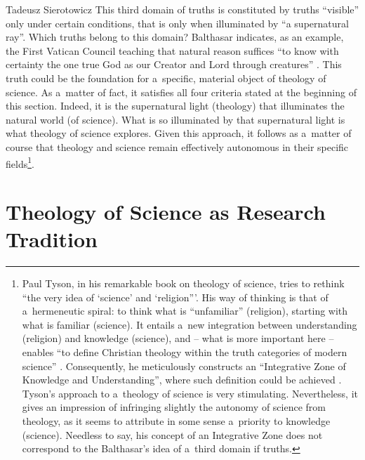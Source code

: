 \begin{artengenv}{Tadeusz Sierotowicz}
This third domain of truths is constituted by truths ``visible'' only under certain conditions, that is only when illuminated by ``a supernatural ray''. Which truths belong to this domain? Balthasar indicates, as an example, the First Vatican Council teaching that natural reason suffices ``to know with certainty the one true God as our Creator and Lord through creatures'' 
\parencite[][p.12]{balthasar_theo-logic_2000}. %
 This truth could be the foundation for a~specific, material object of theology of science. As a~matter of fact, it satisfies all four criteria stated at the beginning of this section. Indeed, it is the supernatural light (theology) that illuminates the natural world (of science). What is so illuminated by that supernatural light is what theology of science explores. Given this approach, it follows as a~matter of course that theology and science remain effectively autonomous in their specific fields\footnote{Paul Tyson, in his remarkable book on theology of science, tries to rethink ``the very idea of ‘science' and ‘religion'''. His way of thinking is that of a~hermeneutic spiral: to think what is ``unfamiliar'' (religion), starting with what is familiar (science). It entails a~new integration between understanding (religion) and knowledge (science), and -- what is more important here -- enables ``to define Christian theology within the truth categories of modern science'' 
\parencite[][p.9]{tyson_christian_2022}. %
 Consequently, he meticulously constructs an ``Integrative Zone of Knowledge and Understanding'', where such definition could be achieved 
\parencite[][chap.9]{tyson_christian_2022}. %
 Tyson's approach to a~theology of science is very stimulating. Nevertheless, it gives an impression of infringing slightly the autonomy of science from theology, as it seems to attribute in some sense a~priority to knowledge (science). Needless to say, his concept of an Integrative Zone does not correspond to the Balthasar's idea of a~third domain if truths. }.



\section{Theology of Science as Research Tradition}


\end{artengenv}
